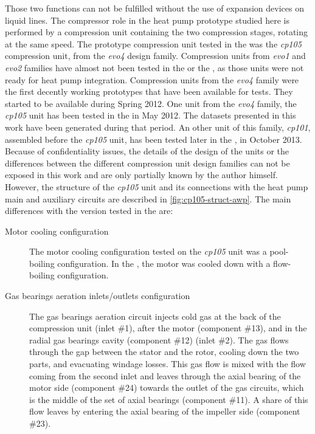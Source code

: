 Those two functions can not be fulfilled without the use of expansion
devices on liquid lines. The compressor role in the heat pump
prototype studied here is performed by a compression unit containing
the two compression stages, rotating at the same speed. The prototype
compression unit tested in the \AWP{} was the \textit{cp105}
compression unit, from the \textit{evo4} design family. Compression
units from \textit{evo1} and \textit{evo2} families have almost not
been tested in the \BWP{} or the \AWP{}, as those units were not ready
for heat pump integration. Compression units from the \textit{evo4}
family were the first decently working prototypes that have been
available for tests. They started to be
available during Spring 2012. One unit from the \textit{evo4} family,
the \textit{cp105} unit has been tested in the \AWP{} in May 2012. The
datasets presented in this work have been generated during that
period. An other unit of this family, \textit{cp101}, assembled before
the \textit{cp105} unit, has been tested later in the \BWP{}, in
October 2013. Because of confidentiality issues, the details of the
design of the units or the differences between the different
compression unit design families can not be exposed in this work and
are only partially known by the author himself. However, the structure
of the \textit{cp105} unit and its connections with the heat pump main
and auxiliary circuits are described in
\cref{fig:cp105-struct-awp}. The main differences with the version
tested in the \BWP{} are:

\begin{description}
\item[Motor cooling configuration] The motor cooling configuration
  tested on the \textit{cp105} unit was a pool-boiling
  configuration. In the \BWP{}, the motor was cooled down with a
  flow-boiling configuration.
\item[Gas bearings aeration inlets/outlets configuration] The gas
  bearings aeration circuit injects cold gas at the back of the
  compression unit (inlet \#1), after the motor (component
  \#13), and in the radial gas
  bearings cavity (component \#12)
  (inlet \#2). The gas flows through the gap between the stator and
  the rotor, cooling down the two parts, and evacuating windage
  losses. This gas flow is mixed with the flow coming from the second
  inlet and leaves through the axial bearing of the motor
  side (component \#24) towards the
  outlet of the gas circuits, which is the middle of the set of axial
  bearings (component \#11). A share of
  this flow leaves by entering the axial bearing of the impeller
  side (component \#23).
\end{description}


